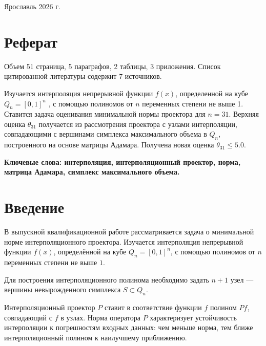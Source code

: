 \documentclass[a4paper,12pt]{article}
\theoremstyle{indented}
\begin{document}
\vspace{0.5cm}
\begin{center}
Ярославль 2026 г.
\end{center}
\newpage

\section*{Реферат}

Объем 51 страница, 5 параграфов, 2 таблицы, 3 приложения. Список цитированной литературы содержит 7 источников.
\par
Изучается интерполяция непрерывной функции $f(x)$, определенной на кубе
$Q_n = [0, 1]^n$ , с помощью полиномов от $n$ переменных степени не выше 1. Ставится
задача оценивания минимальной нормы проектора для $n = 31$. Верхняя оценка $\theta_{31}$
получается из рассмотрения проектора с узлами интерполяции, совпадающими с
вершинами симплекса максимального объема в $Q_n$, построенного на основе матрицы Адамара. Получена новая оценка $\theta_{31} \leq 5.0$.
\par
\textbf{Ключевые слова: интерполяция, интерполяционный проектор, норма, матрица Адамара, симплекс максимального объема.}

\newpage

\pagestyle{plain}
\tableofcontents

\newpage

\section*{Введение}

В выпускной квалификационной работе рассматривается задача о минимальной норме интерполяционного проектора. Изучается интерполяция непрерывной функции $f(x)$, определённой на кубе $Q_n = [0,1]^n$, с помощью полиномов от $n$ переменных степени не выше $1$.
\par
Для построения интерполяционного полинома необходимо задать $n+1$ узел — вершины невырожденного симплекса $S \subset Q_n$.
\par
Интерполяционный проектор $P$ ставит в соответствие функции $f$ полином $P f$, совпадающий с $f$ в узлах. Норма оператора $P$ характеризует устойчивость интерполяции к погрешностям входных данных: чем меньше норма, тем ближе интерполяционный полином к наилучшему приближению.
\end{document}
